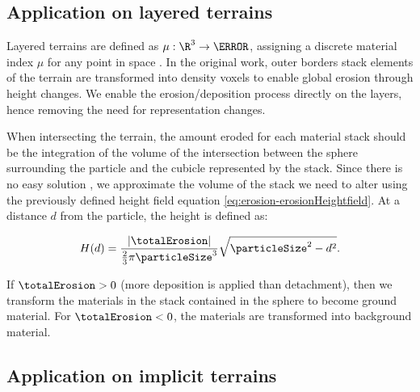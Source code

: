 


\subsection{Application on layered terrains}
\label{sec:erosion-application_on_layers}

Layered terrains are defined as $\mu: \R^3 \to \N$, assigning a discrete material index $\mu$ for any point in space \cite{Benes2001, Peytavie2009b}. In the original work, outer borders stack elements of the terrain are transformed into density voxels to enable global erosion through height changes. We enable the erosion/deposition process directly on the layers, hence removing the need for representation changes.

When intersecting the terrain, the amount eroded for each material stack should be the integration of the volume of the intersection between the sphere surrounding the particle and the cubicle represented by the stack. Since there is no easy solution \cite{Jones2017}, we approximate the volume of the stack we need to alter using the previously defined height field equation \eqref{eq:erosion-erosionHeightfield}.  
At a distance $d$ from the particle, the height is defined as:

\begin{align}
    \label{eq:erosion-erosionLayers}
    H(d) = \frac{|\totalErosion|}{\frac{2}{3} \pi \particleSize^3} \sqrt{\particleSize^2 - d^2}.
\end{align}

If $\totalErosion > 0$ (more deposition is applied than detachment), then we transform the materials in the stack contained in the sphere to become ground material. For $\totalErosion < 0$, the materials are transformed into background material.

\subsection{Application on implicit terrains}
\label{sec:erosion-application_on_implicit}

